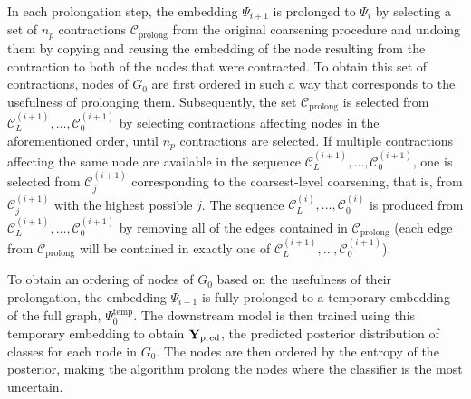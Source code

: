 In each prolongation step, the embedding \( \Psi_{i + 1} \) is prolonged to \( \Psi_i \) by selecting a set of \( n_p \) contractions \( \mathcal{C}_\mathrm{prolong} \) from the original coarsening procedure and undoing them by copying and reusing the embedding of the node resulting from the contraction to both of the nodes that were contracted. To obtain this set of contractions, nodes of \( G_0 \) are first ordered in such a way that corresponds to the usefulness of prolonging them. Subsequently, the set \( \mathcal{C}_\mathrm{prolong} \) is selected from \( \mathcal{C}_L^{(i + 1)}, \dots, \mathcal{C}_0^{(i + 1)} \) by selecting contractions affecting nodes in the aforementioned order, until \( n_p \) contractions are selected. If multiple contractions affecting the same node are available in the sequence \( \mathcal{C}_L^{(i + 1)}, \dots, \mathcal{C}_0^{(i + 1)} \), one is selected from \( \mathcal{C}_j^{(i + 1)} \) corresponding to the coarsest-level coarsening, that is, from \( \mathcal{C}_j^{(i + 1)} \) with the highest possible \( j \). The sequence \( \mathcal{C}_L^{(i)}, \dots, \mathcal{C}_0^{(i)} \) is produced from \( \mathcal{C}_L^{(i + 1)}, \dots, \mathcal{C}_0^{(i + 1)} \) by removing all of the edges contained in \( \mathcal{C}_\mathrm{prolong} \) (each edge from \( \mathcal{C}_\mathrm{prolong} \) will be contained in exactly one of \( \mathcal{C}_L^{(i + 1)}, \dots, \mathcal{C}_0^{(i + 1)} \)).

To obtain an ordering of nodes of \( G_0 \) based on the usefulness of their prolongation, the embedding \( \Psi_{i + 1} \) is fully prolonged to a temporary embedding of the full graph, \( \Psi_0^\mathrm{temp} \). The downstream model is then trained using this temporary embedding to obtain \( \mathbf{Y}_\mathrm{pred} \), the predicted posterior distribution of classes for each node in \( G_0 \). The nodes are then ordered by the entropy of the posterior, making the algorithm prolong the nodes where the classifier is the most uncertain.
